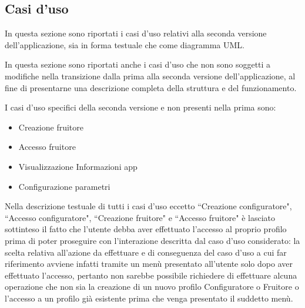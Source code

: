 \subsection{Casi d'uso}
In questa sezione sono riportati i casi d'uso relativi alla seconda versione dell'applicazione, sia in forma testuale che come diagramma UML.\bigskip 

In questa sezione sono riportati anche i casi d'uso che non sono soggetti a modifiche nella transizione dalla prima alla seconda versione dell'applicazione, al fine di presentarne una descrizione completa della struttura e del funzionamento.\bigskip

I casi d'uso specifici della seconda versione e non presenti nella prima sono:
\begin{itemize}
    \item Creazione fruitore
    \item Accesso fruitore
    \item Visualizzazione Informazioni app
    \item Configurazione parametri
\end{itemize} \bigskip

Nella descrizione testuale di tutti i casi d'uso eccetto ``Creazione configuratore", ``Accesso configuratore", ``Creazione fruitore" e ``Accesso fruitore" è lasciato sottinteso il fatto che l'utente debba aver effettuato l'accesso al proprio profilo prima di poter proseguire con l'interazione descritta dal caso d'uso considerato: la scelta relativa all'azione da effettuare e di conseguenza del caso d'uso a cui far riferimento avviene infatti tramite un menù presentato all'utente solo dopo aver effettuato l'accesso, pertanto non sarebbe possibile richiedere di effettuare alcuna operazione che non sia la creazione di un nuovo profilo Configuratore o Fruitore o l'accesso a un profilo già esistente prima che venga presentato il suddetto menù.\bigskip



